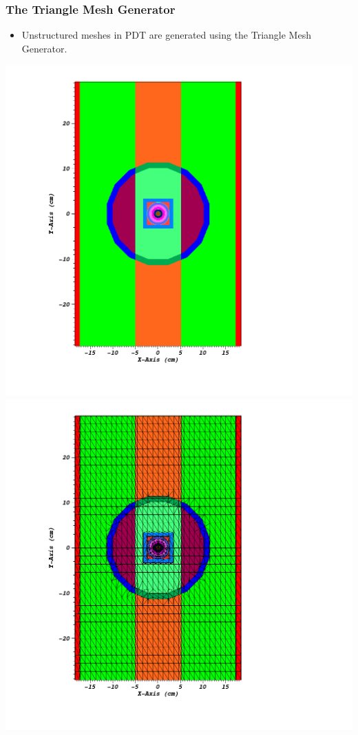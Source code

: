\documentclass[]{beamer}
\begin{document}
\begin{frame}[t]\frametitle{The Triangle Mesh Generator}
	\begin{block}{}
	\begin{itemize}
		\item Unstructured meshes in PDT are generated using the Triangle Mesh Generator.
	\end{itemize}	
	\end{block}
	\includegraphics[scale = 0.15]{figures/IM12DPoly.png}
	\includegraphics[scale = 0.15]{figures/IM12DMesh.png}
\end{frame}
\end{document}
